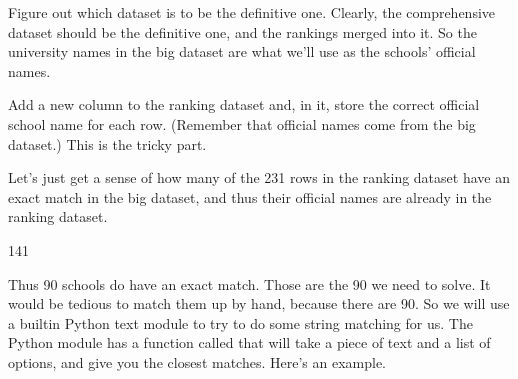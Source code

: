 \documentclass[letterpaper,10pt,english]{sphinxmanual}
\begin{document}
 Figure out which dataset is to be the definitive one.  Clearly, the comprehensive dataset should be the definitive one, and the rankings merged into it.  So the university names in the big dataset are what we’ll use as the schools’ official names.

 Add a new column to the ranking dataset and, in it, store the correct official school name for each row.  (Remember that official names come from the big dataset.)  This is the tricky part.

Let’s just get a sense of how many of the 231 rows in the ranking dataset have an exact match in the big dataset, and thus their official names are already in the ranking dataset.

\begin{sphinxVerbatim}[commandchars=\\\{\}]
   \PYG{p}{[}\PYG{p}{]} 

    
       

 \PYG{p}{[}\PYG{p}{]}   
\end{sphinxVerbatim}

\begin{sphinxVerbatim}[commandchars=\\\{\}]
141
\end{sphinxVerbatim}

Thus 90 schools do  have an exact match.  Those are the 90 we need to solve.  It would be tedious to match them up by hand, because there are 90.  So we will use a built\sphinxhyphen{}in Python text module to try to do some  string matching for us.  The Python module  has a function called  that will take a piece of text and a list of options, and give you the closest matches.  Here’s an example.
\end{document}
